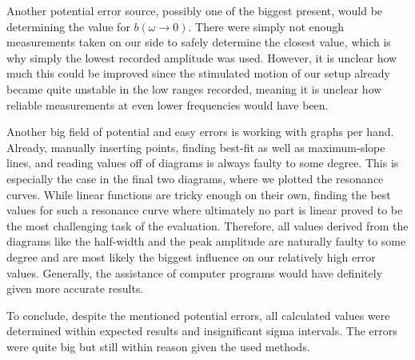 \documentclass{article}
\begin{document}
Another potential error source, possibly one of the biggest present, would be determining the value for $b(\omega \rightarrow 0)$. There were simply not enough measurements taken on our side to safely determine the closest value, which is why simply the lowest recorded amplitude was used. However, it is unclear how much this could be improved since the stimulated motion of our setup already became quite unstable in the low ranges recorded, meaning it is unclear how reliable measurements at even lower frequencies would have been. 

Another big field of potential and easy errors is working with graphs per hand. Already, manually inserting points, finding best-fit as well as maximum-slope lines, and reading values off of diagrams is always faulty to some degree. This is especially the case in the final two diagrams, where we plotted the resonance curves. While linear functions are tricky enough on their own, finding the best values for such a resonance curve where ultimately no part is linear proved to be the most challenging task of the evaluation. Therefore, all values derived from the diagrams like the half-width and the peak amplitude are naturally faulty to some degree and are most likely the biggest influence on our relatively high error values. Generally, the assistance of computer programs would have definitely given more accurate results.

To conclude, despite the mentioned potential errors, all calculated values were determined within expected results and insignificant sigma intervals. The errors were quite big but still within reason given the used methods.  
\end{document}
